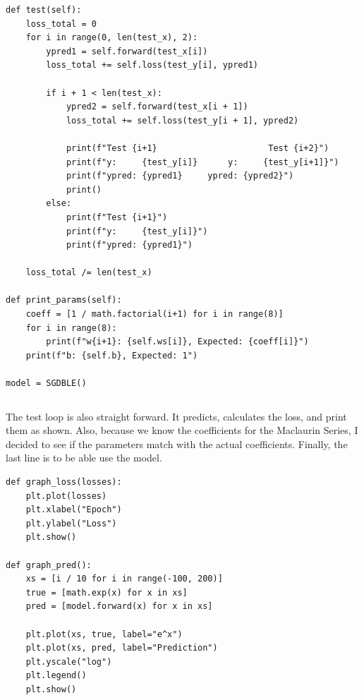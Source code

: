 \documentclass[../../main.tex]{subfiles}
\begin{document}
\begin{jupyter}
\begin{lstlisting}[style=jin]
def test(self):
    loss_total = 0
    for i in range(0, len(test_x), 2):
        ypred1 = self.forward(test_x[i])
        loss_total += self.loss(test_y[i], ypred1)

        if i + 1 < len(test_x):
            ypred2 = self.forward(test_x[i + 1])
            loss_total += self.loss(test_y[i + 1], ypred2)

            print(f"Test {i+1}                      Test {i+2}")
            print(f"y:     {test_y[i]}      y:     {test_y[i+1]}")
            print(f"ypred: {ypred1}     ypred: {ypred2}")
            print()
        else:
            print(f"Test {i+1}")
            print(f"y:     {test_y[i]}")
            print(f"ypred: {ypred1}")

    loss_total /= len(test_x)

def print_params(self):
    coeff = [1 / math.factorial(i+1) for i in range(8)]
    for i in range(8):
        print(f"w{i+1}: {self.ws[i]}, Expected: {coeff[i]}")
    print(f"b: {self.b}, Expected: 1")

model = SGDBLE()
\end{lstlisting}
\begin{lstlisting}[style=jout]
\end{lstlisting}
\end{jupyter}

The test loop is also straight forward. It predicts, calculates the
loss, and print them as shown. Also, because we know the coefficients
for the Maclaurin Series, I decided to see if the parameters match
with the actual coefficients. Finally, the last line is to be able
use the model.

\begin{jupyter}
\begin{lstlisting}[style=jin]
def graph_loss(losses):
    plt.plot(losses)
    plt.xlabel("Epoch")
    plt.ylabel("Loss")
    plt.show()
    
def graph_pred():
    xs = [i / 10 for i in range(-100, 200)]
    true = [math.exp(x) for x in xs]
    pred = [model.forward(x) for x in xs]

    plt.plot(xs, true, label="e^x")
    plt.plot(xs, pred, label="Prediction")
    plt.yscale("log")
    plt.legend()
    plt.show()
\end{lstlisting}
\begin{lstlisting}[style=jout]
\end{lstlisting}
\end{jupyter}
\end{document}
